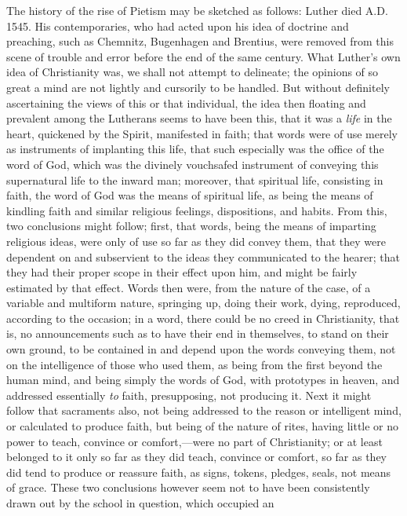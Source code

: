 The history of the rise of Pietism may be sketched
as follows: Luther died A.D. 1545. His contemporaries, who had acted
upon his idea of doctrine and preaching, such as Chemnitz, Bugenhagen
and Brentius, were removed from this scene of trouble and error before
the end of the same century. What Luther's own idea of Christianity was,
we shall not attempt to delineate; the opinions of so great a mind are
not lightly and cursorily to be handled. But without definitely
ascertaining the views of this or that individual, the idea then
floating and prevalent among the Lutherans seems to have been this, that
it was a \emph{life} in the heart, quickened by the Spirit, manifested
in faith; that words were of use merely as instruments of implanting
this life, that such especially was the office of the word of God, which
was the divinely vouchsafed instrument of conveying this supernatural
life to the inward man; moreover, that spiritual life, consisting in
faith, the word of God was the means of spiritual life, as being the
means of kindling faith and similar religious feelings, dispositions,
and habits. From this, two conclusions might follow; first, that words,
being the means of imparting religious ideas, were only of use so far as
they did convey them, that they were dependent on and subservient to the
ideas they communicated to the hearer; that they had their proper scope
in their effect upon him, and might be fairly estimated by that effect.
Words then were, from the nature of the case, of a variable and
multiform nature, springing up, doing their work, dying, reproduced,
according to the occasion; in a word, there could be no creed in
Christianity, that is, no announcements such as to have their end in
themselves, to stand on their own ground, to be contained in and depend
upon the words conveying them, not on the intelligence of those who
used them, as being from the first beyond the human mind, and being
simply the words of God, with prototypes in heaven, and addressed
essentially \emph{to} faith, presupposing, not producing it. Next it
might follow that sacraments also, not being addressed to the reason or
intelligent mind, or calculated to produce faith, but being of the
nature of rites, having little or no power to teach, convince or
comfort,—were no part of Christianity; or at least belonged to it only
so far as they did teach, convince or comfort, so far as they did tend
to produce or reassure faith, as signs, tokens, pledges, seals, not
means of grace. These two conclusions however seem not to have been
consistently drawn out by the school in question, which occupied an
